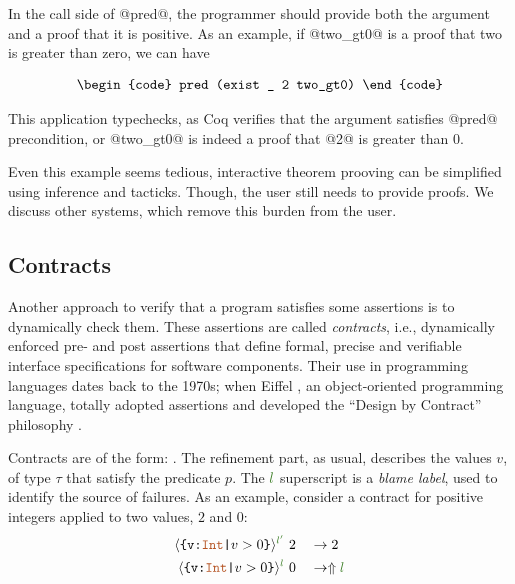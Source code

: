 \begin{comment}
where zgtz

\begin{verbatim}
Lemma zgtz : 0 > 0 -> False.
  crush.
Qed.

Inductive eq (A:Type) (x:A) : A -> Prop :=
    eq_refl : x = x :>A
\end{verbatim}
\end{comment}

In the call side of @pred@, the programmer should provide
both the argument and a proof that it is positive.
As an example,
if @two_gt0@ is a proof that two is greater than zero, we can have

$$\centering
\begin{tabular}{c}
\begin{code}
pred (exist _ 2 two_gt0)
\end{code}
\end{tabular}
$$
 
This application typechecks, as Coq verifies that 
the argument satisfies @pred@ precondition, or 
@two_gt0@ is indeed a proof that @2@ is greater than 0. 

\begin{comment}
Theorem two_gt0 : 2 > 0.
  crush.
Qed.
\end{comment}

Even this example seems tedious, 
interactive theorem prooving can be simplified
using inference and tacticks. 
%
Though, the user still needs to provide proofs.
%
We discuss other systems, which remove this burden from the user.

\subsection{Contracts}
Another approach to verify that a program satisfies some 
assertions is to dynamically check them.
% 
These assertions are called \textit{contracts}, i.e., 
dynamically enforced pre- and post assertions that
define formal, precise and verifiable interface specifications 
for software components.
%	
Their use in programming languages dates back to the 1970s; 
when Eiffel \cite{Eiffel}, an object-oriented programming language,
totally adopted assertions and developed the 
``Design by Contract'' philosophy \cite{Meyer92}.

Contracts are of the form:
.
The refinement part, as usual,  describes the values $v$, of type $\tau$
that satisfy the predicate $p$. 
The $\mklabel{l}$ superscript is a \textit{blame label}, used to
identify the source of failures.
%
As an example, 
consider a contract for positive integers 
applied to two values, $2$ and $0$: 
\begin{align*}
\trefpos{l'}&\ 2 &&\rightarrow 2 \\
\trefpos{l}&\ 0  &&\rightarrow \elabel{l}
\end{align*}

